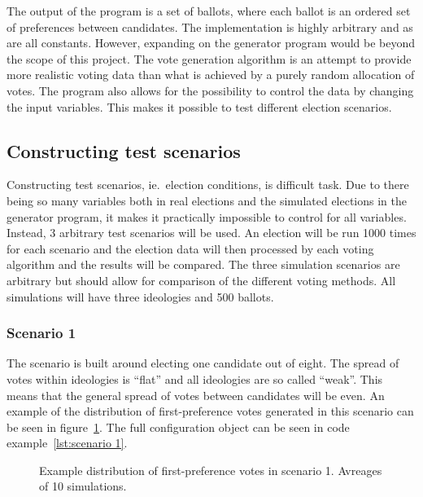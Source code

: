 \documentclass[12pt]{article}
\begin{document}
The output of the program is a set of ballots, where each ballot is an ordered set of preferences between candidates. The implementation is highly arbitrary and as are all constants. However, expanding on the generator program would be beyond the scope of this project. The vote generation algorithm is an attempt to provide more realistic voting data than what is achieved by a purely random allocation of votes. The program also allows for the possibility to control the data by changing the input variables. This makes it possible to test different election scenarios.
\subsection{Constructing test scenarios}
Constructing test scenarios, ie.\ election conditions, is difficult task. Due to there being so many variables both in real elections and the simulated elections in the generator program, it makes it practically impossible to control for all variables. Instead, 3 arbitrary test scenarios will be used. An election will be run 1000 times for each scenario and the election data will then processed by each voting algorithm and the results will be compared. The three simulation scenarios are arbitrary but should allow for comparison of the different voting methods. All simulations will have three ideologies and 500 ballots.
\subsubsection{Scenario 1}
\label{sec:method-scenario1}
The scenario is built around electing one candidate out of eight. The spread of votes within ideologies is ``flat'' and all ideologies are so called ``weak''. This means that the general spread of votes between candidates will be even. An example of the distribution of first-preference votes generated in this scenario can be seen in figure~\ref{fig:example of scenario 1}. The full configuration object can be seen in code example~\ref{lst:scenario 1}.
\begin{figure}[H]
	\centering
	\caption{Example distribution of first-preference votes in scenario 1. Avreages of 10 simulations.}
\label{fig:example of scenario 1}
\end{figure}
\end{document}
